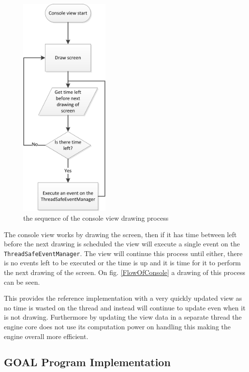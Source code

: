\begin{figure}
\includegraphics[width=0.4\textwidth]{ConsoleViewDrawingFlowChart}

\caption{the sequence of the console view drawing process}


\end{figure}


The console view works by drawing the screen, then if it has time
between left before the next drawing is scheduled the view will execute
a single event on the \texttt{ThreadSafeEventManager}. The view will
continue this process until either, there is no events left to be
executed or the time is up and it is time for it to perform the next
drawing of the screen. On fig. \ref{FlowOfConsole} a drawing of this
process can be seen.

This provides the reference implementation with a very quickly updated
view as no time is wasted on the thread and instead will continue
to update even when it is not drawing. Furthermore by updating the
view data in a separate thread the engine core does not use its computation
power on handling this making the engine overall more efficient.


\subsection{GOAL Program Implementation}

